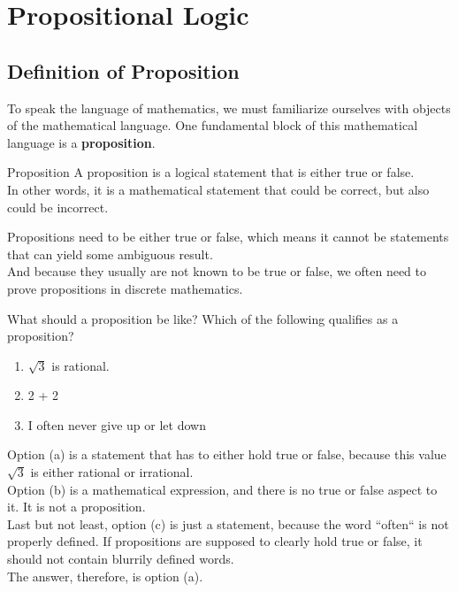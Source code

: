 
\chapter{Propositional Logic}

\section{Definition of Proposition}
To speak the language of mathematics, we must familiarize ourselves with objects of the mathematical language. One fundamental block of this mathematical language is a \textbf{proposition}.
\begin{ln-define}{Proposition}{}
    A proposition is a logical statement that is either true or false. \\
    In other words, it is a mathematical statement that could be correct, but also could be incorrect.
\end{ln-define}
Propositions need to be either true or false, which means it cannot be statements that can yield some ambiguous result. \\
And because they usually are not known to be true or false, we often need to prove propositions in discrete mathematics.
\begin{ln-think}{What should a proposition be like?}{}
    Which of the following qualifies as a proposition?
    \begin{enumerate}
        \item[(a)] $\sqrt{3}$ is rational.
        \item[(b)] 2 + 2
        \item[(c)] I often never give up or let down
    \end{enumerate}
    \tcblower
    Option (a) is a statement that has to either hold true or false, because this value $\sqrt{3}$ is either rational or irrational. \\
    Option (b) is a mathematical expression, and there is no true or false aspect to it. It is not a proposition. \\
    Last but not least, option (c) is just a statement, because the word ``often`` is not properly defined. If propositions are supposed to clearly hold true or false, it should not contain blurrily defined words. \\
    The answer, therefore, is option (a).
\end{ln-think}

